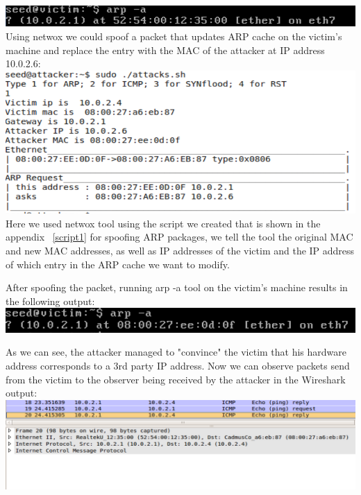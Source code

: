 \documentclass[12pt, a4paper, pdflatex]{article}
\begin{document}
\includegraphics[width=.95\textwidth]{gfx/arp1}\\


Using netwox we could spoof a packet that updates ARP cache on the victim's machine and replace the entry with the MAC of the attacker at IP address 10.0.2.6:\\

\includegraphics[width=.95\textwidth]{gfx/arp-attack}\\

Here we used netwox tool using the script we created that is shown in the appendix ~\ref{script1} for spoofing ARP packages, we tell the tool the original MAC and new MAC addresses, as well as IP addresses of the victim and the IP address of which entry in the ARP cache we want to modify.

After spoofing the packet, running arp -a tool on the victim's machine results in the following output:\\

\includegraphics[width=.95\textwidth]{gfx/arp-after-attack}

As we can see, the attacker managed to "convince" the victim that his hardware address corresponds to a 3rd party IP address. Now we can observe packets send from the victim to the observer being received by the attacker in the Wireshark output:\\

\includegraphics[width=.95\textwidth]{gfx/arp-shark}
\end{document}
